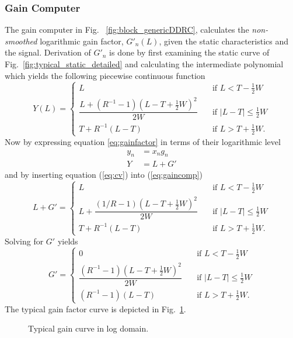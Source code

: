 \documentclass[../main2.tex]{subfiles}
\providecommand{\rootdir}{..}
\begin{document}
\subsubsection{Gain Computer} \label{gain_computer}
The gain computer in Fig. ~\ref{fig:block_genericDDRC}, calculates the \emph{non-smoothed} logarithmic gain factor, $G'_n(L)$, given the static characteristics and the signal. Derivation of $G'_n$ is done by first examining the static curve of Fig.~\ref{fig:typical_static_detailed} and calculating the intermediate polynomial which yields the following piecewise continuous function
\begin{equation} \label{eq:gaincomp}
Y(L) = \begin{cases}
    L & \quad \text{if }L<T-\frac{1}{2}W \\[0.8em]
    \dfrac{L+(R^{-1}-1)(L-T+\frac{1}{2}W)^2}{2W}& \quad \text{if } |L-T| \leq \frac{1}{2}W\\[1.2em]
    T+ R^{-1}(L-T) & \quad \text{if } L > T + \frac{1}{2}W.
\end{cases}
\end{equation}
Now  by expressing equation \eqref{eq:gainfactor} in terms of their logarithmic level
\begin{align}
y_n &= x_ng_n   \\
Y &= L + G' \label{eq:cv}
\end{align}
and by inserting equation (\ref{eq:cv}) into (\ref{eq:gaincomp})
\begin{equation}
L+G' = \begin{cases}
    L & \quad \text{if }L < T-\frac{1}{2}W \\[0.8em]
    L + \dfrac{(1/R-1)(L-T+\frac{1}{2}W)^2}{2W}& \quad \text{if } |L-T| \leq \frac{1}{2}W\\[1.2em]
    T+ R^{-1}(L-T) & \quad \text{if } L > T + \frac{1}{2}W.
\end{cases}
\end{equation}
Solving for $G'$ yields
\begin{equation} \label{eq:c}
G' = \begin{cases}
    0 & \quad \text{if }L <T -\frac{1}{2}W \\[0.8em]
    \dfrac{(R^{-1}-1)(L-T+\frac{1}{2}W)^2}{2W}& \quad \text{if } |L-T| \leq \frac{1}{2}W\\[1.2em]
    \left(R^{-1}-1\right)\left(L-T\right) & \quad \text{if } L > T + \frac{1}{2}W.
 \end{cases}
\end{equation}
The typical gain factor curve is depicted in Fig.~\ref{fig:typical_gain_detailed}.
\begin{figure}[h]
\centerline{}
\caption{Typical gain curve in log domain.}
\label{fig:typical_gain_detailed}
\end{figure}
\end{document}
